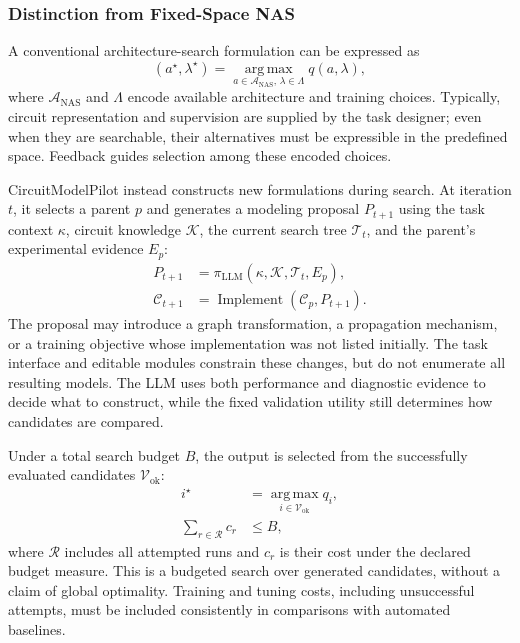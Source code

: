 \subsubsection{Distinction from Fixed-Space NAS}

A conventional architecture-search formulation can be expressed as
\begin{equation}
    (a^\star,\lambda^\star)
    =\operatorname*{arg\,max}_{a\in\mathcal{A}_{\mathrm{NAS}},\,
    \lambda\in\Lambda} q(a,\lambda),
    \label{eq:fixed_nas}
\end{equation}
where $\mathcal{A}_{\mathrm{NAS}}$ and $\Lambda$ encode available architecture and training choices. Typically, circuit representation and supervision are supplied by the task designer; even when they are searchable, their alternatives must be expressible in the predefined space. Feedback guides selection among these encoded choices.

CircuitModelPilot instead constructs new formulations during search. At iteration $t$, it selects a parent $p$ and generates a modeling proposal $P_{t+1}$ using the task context $\kappa$, circuit knowledge $\mathcal{K}$, the current search tree $\mathcal{T}_t$, and the parent's experimental evidence $E_p$:
\begin{equation}
\begin{aligned}
 P_{t+1}&=\pi_{\mathrm{LLM}}
 (\kappa,\mathcal{K},\mathcal{T}_t,E_p),\\
 \mathcal{C}_{t+1}&=\operatorname{Implement}
 (\mathcal{C}_p,P_{t+1}).
\end{aligned}
\label{eq:adaptive_modeling}
\end{equation}
The proposal may introduce a graph transformation, a propagation mechanism, or a training objective whose implementation was not listed initially. The task interface and editable modules constrain these changes, but do not enumerate all resulting models. The LLM uses both performance and diagnostic evidence to decide what to construct, while the fixed validation utility still determines how candidates are compared.

Under a total search budget $B$, the output is selected from the successfully evaluated candidates $\mathcal{V}_{\mathrm{ok}}$:
\begin{equation}
\begin{aligned}
 i^\star&=\operatorname*{arg\,max}_{i\in\mathcal{V}_{\mathrm{ok}}}q_i,\\
 \sum_{r\in\mathcal{R}}c_r&\leq B,
\end{aligned}
\label{eq:semantic_search}
\end{equation}
where $\mathcal{R}$ includes all attempted runs and $c_r$ is their cost under the declared budget measure. This is a budgeted search over generated candidates, without a claim of global optimality. Training and tuning costs, including unsuccessful attempts, must be included consistently in comparisons with automated baselines.

